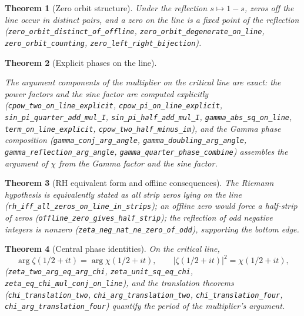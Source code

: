 \documentclass{article}
\newtheorem{theorem}{Theorem}[section]
\newcommand{\zt}{\zeta}
\newcommand{\Xchi}{\chi}
\begin{document}
\begin{theorem}[Zero orbit structure]
\label{thm:orbit}
Under the reflection $s\mapsto 1-s$, zeros off the line occur in distinct
pairs, and a zero on the line is a fixed point of the reflection
(\texttt{zero\_orbit\_distinct\_of\_offline},
\texttt{zero\_orbit\_degenerate\_on\_line}, \texttt{zero\_orbit\_counting},
\texttt{zero\_left\_right\_bijection}).
\end{theorem}

\begin{theorem}[Explicit phases on the line]
\label{thm:explicit}
\begin{sloppypar}The argument components of the multiplier on the critical
line are exact: the power factors and the sine factor are computed
explicitly
(\texttt{cpow\_two\_on\_line\_explicit}, \texttt{cpow\_pi\_on\_line\_explicit},
\texttt{sin\_pi\_quarter\_add\_mul\_I}, \texttt{sin\_pi\_half\_add\_mul\_I},
\texttt{gamma\_abs\_sq\_on\_line}, \texttt{term\_on\_line\_explicit},
\texttt{cpow\_two\_half\_minus\_im}), and the Gamma phase composition
(\texttt{gamma\_conj\_arg\_angle}, \texttt{gamma\_doubling\_arg\_angle},
\texttt{gamma\_reflection\_arg\_angle}, \texttt{gamma\_quarter\_phase\_combine})
assembles the argument of $\Xchi$ from the Gamma factor and the sine
factor.\end{sloppypar}
\end{theorem}

\begin{theorem}[RH equivalent form and offline consequences]
\label{thm:rheq}
The Riemann hypothesis is equivalently stated as all strip zeros lying on
the line (\texttt{rh\_iff\_all\_zeros\_on\_line\_in\_strips}); an offline
zero would force a half-strip of zeros
(\texttt{offline\_zero\_gives\_half\_strip}); the reflection of odd
negative integers is nonzero (\texttt{zeta\_neg\_nat\_ne\_zero\_of\_odd}),
supporting the bottom edge.
\end{theorem}

\begin{theorem}[Central phase identities]
\label{thm:phaseid}
On the critical line,
\begin{equation}
\label{eq:phase}
\arg\zt(1/2+it)=\arg\Xchi(1/2+it),\qquad
|\zt(1/2+it)|^2=\Xchi(1/2+it),
\end{equation}
(\texttt{zeta\_two\_arg\_eq\_arg\_chi}, \texttt{zeta\_unit\_sq\_eq\_chi},
\texttt{zeta\_eq\_chi\_mul\_conj\_on\_line}), and the translation theorems
(\texttt{chi\_translation\_two}, \texttt{chi\_arg\_translation\_two},
\texttt{chi\_translation\_four}, \texttt{chi\_arg\_translation\_four})
quantify the period of the multiplier's argument.
\end{theorem}
\end{document}

